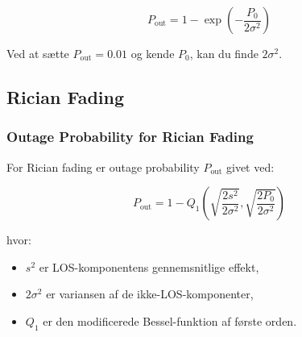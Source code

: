 \documentclass[a4paper,12pt]{book}
\begin{document}
	\[
	P_\text{out} = 1 - \exp\left(-\frac{P_0}{2\sigma^2}\right)
	\]
	
	Ved at sætte \( P_\text{out} = 0.01 \) og kende \( P_0 \), kan du finde \( 2\sigma^2 \).
	
	\subsection{Rician Fading}
	
	\subsubsection{Outage Probability for Rician Fading}
	For Rician fading er outage probability \( P_\text{out} \) givet ved:
	
	\[
	P_\text{out} = 1 - Q_1\left(\sqrt{\frac{2s^2}{2\sigma^2}}, \sqrt{\frac{2P_0}{2\sigma^2}}\right)
	\]
	
	hvor:
	\begin{itemize}
		\item \( s^2 \) er LOS-komponentens gennemsnitlige effekt,
		\item \( 2\sigma^2 \) er variansen af de ikke-LOS-komponenter,
		\item \( Q_1 \) er den modificerede Bessel-funktion af første orden.
	\end{itemize}
	
	
\end{document}
